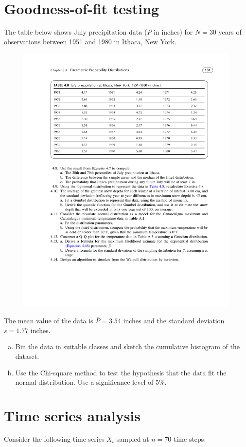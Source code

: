 \documentclass[12pt]{article}
\begin{document}
\section{Goodness-of-fit testing}
The table below shows July precipitation data ($P$ in inches) for $N=30$ years of observations between 1951 and 1980 in Ithaca, New York.

\begin{figure}[h!]
    \centering
    \includegraphics[width=.8\textwidth]{table48} 
\end{figure}

The mean value of the data is $\bar{P}=3.54$ inches and the standard deviation $s=1.77$ inches.

\begin{enumerate}[(a)] 
\item Bin the data in suitable classes and sketch the cumulative histogram of the dataset.
\item Use the Chi-square method to test the hypothesis that the data fit the normal distribution. Use a significance level of 5\%.
\end{enumerate}



\pagebreak
\section{Time series analysis}
Consider the following time series $X_t$ sampled at $n=70$ time steps:
\end{document}
